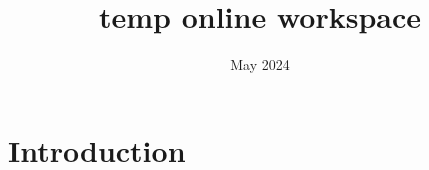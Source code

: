 \documentclass{article}
\title{temp online workspace}
\author{ }
\date{May 2024}
\begin{document}
\maketitle

\section{Introduction}
\end{document}
